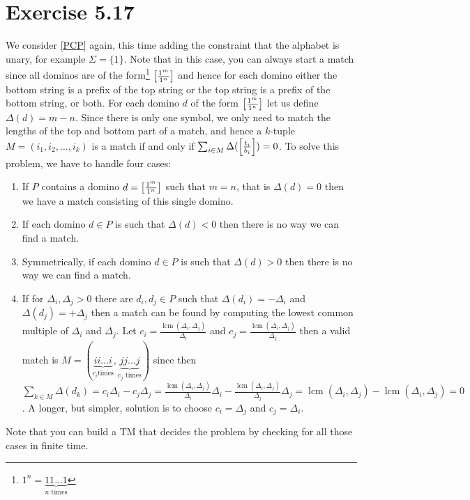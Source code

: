 \documentclass{article}
\begin{document}
\section{Exercise 5.17}
We consider \ref{PCP} again, this time adding the constraint that the alphabet
is unary, for example \(\Sigma = \{1\}\). Note that in this case, you can always start a
match since all dominos are of the form\footnote{\(1^n = \underbrace{11\ldots1}_{n \text{ times}}\)}
\(\mleft[\frac{1^m}{1^n}\mright]\)
and hence for each domino either the bottom string is a prefix of the top
string or the top string is a prefix of the bottom string, or both.
For each domino \(d\) of the form \(\mleft[\frac{1^m}{1^n}\mright]\) let us
define \(\Delta(d) = m - n\). Since there is only one symbol,
we only need to match the lengths of the
top and bottom part of a match, and hence a \(k\)-tuple \(M = (i_1,i_2,\ldots,i_k)\)
is a match if and only if \(\sum_{i \in M}
	\Delta(\mleft[\frac{t_i}{b_i}\mright]) = 0\).
To solve this problem, we have to handle four cases:
\begin{enumerate}
	\item If \(P\) contains a domino \(d=\mleft[\frac{1^m}{1^n}\mright]\) such that
		\(m=n\), that is \(\Delta(d) = 0\) then we have a match consisting of this single domino.
	\item If each domino \(d \in P\) is such that \(\Delta(d) < 0\) then there
		is no way we can find a match.
	\item Symmetrically, if each domino \(d \in P\) is such that \(\Delta(d) > 0\) then there
		is no way we can find a match.
	\item If for \(\Delta_i, \Delta_j > 0\) there are \(d_i,d_j \in P\) such
		that \(\Delta(d_i) = -\Delta_i\) and \(\Delta(d_j) = +\Delta_j\) then a
		match can be found by computing the lowest common multiple of
		\(\Delta_i\) and \(\Delta_j\). Let \(c_i =
			\frac{\mathop{lcm}(\Delta_i,\Delta_j)}{\Delta_i}\) and \(c_j =
			\frac{\mathop{lcm}(\Delta_i,\Delta_j)}{\Delta_j}\) then a valid
			match is \(M = (\underbrace{i i \ldots i}_{c_i \text{
							times}},\underbrace{j j \ldots j}_{c_j
			\text{ times}})\) since then \(\sum_{k \in M}
	\Delta(d_k) = c_i \Delta_i - c_j \Delta_j
= \frac{\mathop{lcm}(\Delta_i,\Delta_j)}{\Delta_i} \Delta_i -
\frac{\mathop{lcm}(\Delta_i,\Delta_j)}{\Delta_j} \Delta_j
=\mathop{lcm}(\Delta_i,\Delta_j) - \mathop{lcm}(\Delta_i,\Delta_j)
= 0\). A longer, but simpler, solution is to choose $c_i = \Delta_j$ and $c_j =
\Delta_i$.
\end{enumerate}
Note that you can build a TM that decides the problem by checking for all those
cases in finite time.
\end{document}
